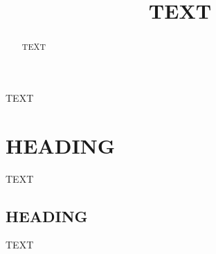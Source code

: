 \documentclass[journal abbreviation, manuscript]{copernicus}
\begin{document}
\title{TEXT}



\Author[][EMAIL]{}{} %
\Author[]{}{}
\Author[]{}{}















\received{}
\pubdiscuss{} %
\revised{}
\accepted{}
\published{}




\maketitle



\begin{abstract}
TEXT
\end{abstract}




\introduction  %
TEXT


\section{HEADING}
TEXT


\subsection{HEADING}
TEXT
\end{document}
